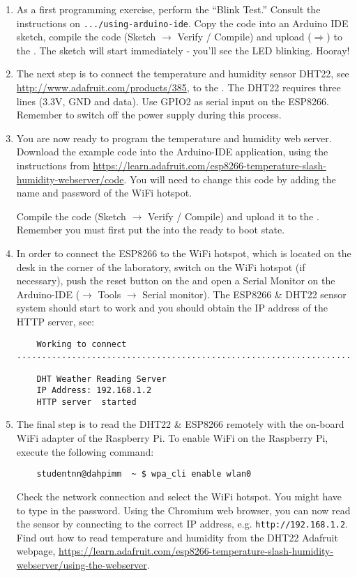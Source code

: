 \begin{enumerate}
\item As a first programming exercise, perform the ``Blink Test.''
Consult the instructions on {\tt .../using-arduino-ide}.
Copy the code into an Arduino IDE sketch, compile the code (Sketch $\rightarrow$ Verify / Compile) and upload ($\Rightarrow$) to the \microcontroller. 
The sketch will start immediately - you'll see the LED blinking. Hooray!

\item The next step is to connect the temperature and humidity sensor DHT22, see \url{http://www.adafruit.com/products/385}, to the \microcontroller.
The DHT22 requires three lines (3.3V, GND and data).
Use GPIO2 as serial input on the ESP8266.
Remember to switch off the power supply during this process.

\item You are now ready to program the temperature and humidity web server. 
Download the example code into the Arduino-IDE application, using the instructions from \url{https://learn.adafruit.com/esp8266-temperature-slash-humidity-webserver/code}.
You will need to change this code by adding the name and password of the WiFi hotspot.
%

%
Compile the code (Sketch $\rightarrow$ Verify / Compile) and upload it to the \microcontroller.
Remember you must first put the \microcontroller into the ready to boot state.

\item In order to connect the ESP8266 \microcontroller to the WiFi hotspot, which is located on the desk in the corner of the laboratory, switch on the WiFi hotspot (if necessary), push the reset button on the \microcontroller and open a Serial Monitor on the Arduino-IDE  ($\rightarrow$ Tools  $\rightarrow$ Serial monitor).
The ESP8266 \& DHT22 sensor system should start to work and you  should  obtain the IP address of the HTTP server, see:
\begin{verbatim}
    Working to connect ................................................................................................

    DHT Weather Reading Server
    IP Address: 192.168.1.2
    HTTP server  started
\end{verbatim}

\item The final step is to read the DHT22 \& ESP8266 remotely with the on-board WiFi adapter of the Raspberry Pi.
To enable WiFi on the Raspberry Pi, execute the following command:
%
\begin{verbatim}
    studentnn@dahpimm  ~ $ wpa_cli enable wlan0 
\end{verbatim}
%
Check the network connection and select the WiFi hotspot.
You might have to type in the password.
Using the Chromium web browser, you can now read the sensor by connecting to the correct IP address, e.g. {\tt http://192.168.1.2}.
Find out how to read temperature and humidity from the DHT22 Adafruit webpage, \url{https://learn.adafruit.com/esp8266-temperature-slash-humidity-webserver/using-the-webserver}.

 
\end{enumerate}


